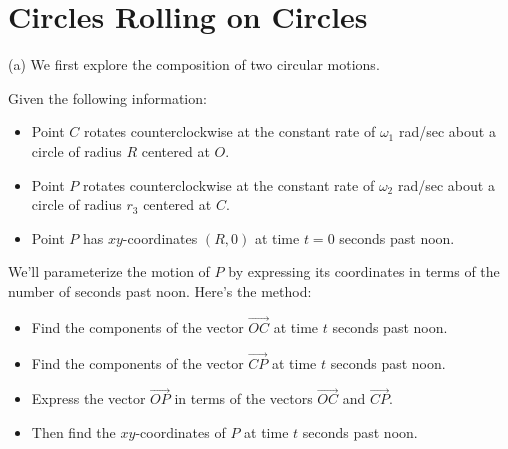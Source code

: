 \documentclass{ximera}
\begin{document}
\section{Circles Rolling on Circles}

\begin{exploration}  \label{Edst4hnt}
(a) We first explore the composition of two circular motions.

Given the following information:
\begin{itemize}

\item{Point $C$ rotates counterclockwise  at the constant rate of $\omega_1$ rad/sec about a circle of radius $R$ centered at $O$.}

\item{Point $P$ rotates counterclockwise at the constant rate of $\omega_2$ rad/sec about a circle of radius $r_3$ centered at $C$.}


\item{Point $P$ has $xy$-coordinates $(R , 0)$ at time $t=0$ seconds past noon.}

\end{itemize}


We'll parameterize the motion of $P$ by expressing its coordinates in terms of the number of seconds past noon. Here's the method:

\begin{itemize}

\item{Find the components of the vector $\overrightarrow{OC}$ at time $t$ seconds past noon.}

\item{Find the components of the vector $\overrightarrow{CP}$ at time $t$ seconds past noon.}



\item{Express the vector $\overrightarrow{OP}$ in terms of the vectors $\overrightarrow{OC}$ and $\overrightarrow{CP}$.}



\item{Then find the $xy$-coordinates of $P$ at time $t$ seconds past noon.}


\end{itemize}
\end{exploration}
\end{document}
